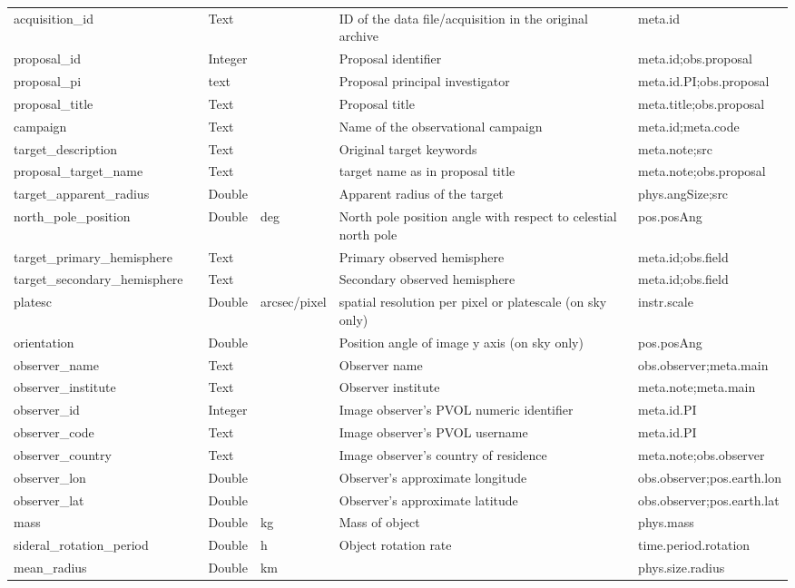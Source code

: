 \documentclass[11pt,a4paper]{ivoa}
\begin{document}
\begin{longtable}{p{3.5cm}p{0.5cm}p{1cm}p{1cm}p{7cm}p{3cm}}
acquisition\_id&&Text&&ID of the data file/acquisition in the original archive&meta.id\\
proposal\_id&&Integer&&Proposal identifier&meta.id;obs.proposal\\
proposal\_pi&&text&&Proposal principal investigator&meta.id.PI;obs.proposal\\
proposal\_title&&Text&&Proposal title&meta.title;obs.proposal\\
campaign&&Text&&Name of the observational campaign&meta.id;meta.code\\
target\_description&&Text&&Original target keywords&meta.note;src\\
proposal\_target\_name&&Text&&target name as in proposal title&meta.note;obs.proposal\\
target\_apparent\_radius&&Double&&Apparent radius of the target&phys.angSize;src\\
north\_pole\_position&&Double&deg&North pole position angle with respect to celestial north pole&pos.posAng\\
target\_primary\_hemisphere&&Text&&Primary observed hemisphere&meta.id;obs.field\\
target\_secondary\_hemisphere&&Text&&Secondary observed hemisphere&meta.id;obs.field\\
platesc&&Double&arcsec/pixel&spatial resolution per pixel or platescale (on sky only)&instr.scale\\
orientation&&Double&&Position angle of image y axis (on sky only)&pos.posAng\\
observer\_name&&Text&&Observer name&obs.observer;meta.main\\
observer\_institute&&Text&&Observer institute&meta.note;meta.main\\
observer\_id&&Integer&&Image observer's PVOL numeric identifier&meta.id.PI\\
observer\_code&&Text&&Image observer's PVOL username&meta.id.PI\\
observer\_country&&Text&&Image observer's country of residence&meta.note;obs.observer\\
observer\_lon&&Double&&Observer's approximate longitude&obs.observer;pos.earth.lon\\
observer\_lat&&Double&&Observer's approximate latitude&obs.observer;pos.earth.lat\\
mass&&Double&kg&Mass of object&phys.mass\\
sideral\_rotation\_period&&Double&h&Object rotation rate&time.period.rotation\\
mean\_radius&&Double&km&&phys.size.radius\\

\end{longtable}
\end{document}
